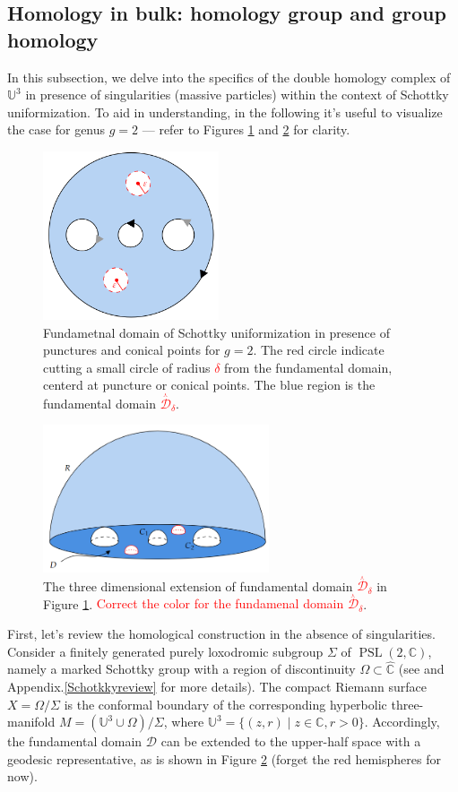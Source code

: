\documentclass[a4paper,11pt]{article}
\newcommand{\PSLC}{\operatorname{PSL}(2,\mathbb{C})}
\newcommand{\SchottkyFund}{\mathcal{D}}
\newcommand{\singfund}{\overset{{}_{\curlywedge}}{\mathcal{D}}}
\begin{document}
\subsection{Homology in bulk: homology group and group homology}\label{homology}
In this subsection, we delve into the specifics of the  double homology complex of $\mathbb{U}^3$ in presence of singularities (massive particles) within the context of Schottky uniformization. To aid in understanding, in the following it's useful to visualize the case for genus  $g=2$ --- refer to Figures \ref{fig:1} and \ref{fig:2} for clarity.
\begin{figure}[h]
\centering
\includegraphics[width=14em]{Pics/1.png}
\caption{Fundametnal domain of Schottky uniformization in presence of punctures and conical points for $g=2$. The red circle indicate cutting a small circle of radius \textcolor{red}{$\delta$} from the fundamental domain, centerd at puncture or conical points. The blue region is the fundamental domain \textcolor{red}{$\singfund_{\delta}$}.}
\label{fig:1}
\end{figure}
\begin{figure}[h]
\centering
\includegraphics[width=18em]{Pics/2.png}
\caption{The three dimensional extension of fundamental domain \textcolor{red}{$\singfund_{\delta}$} in Figure \ref{fig:1}. \textcolor{red}{Correct the color for the fundamenal domain $\singfund_{\delta}$}.}
\label{fig:2}
\end{figure}

First, let's review the  homological construction in the absence of singularities. Consider a finitely generated purely loxodromic subgroup $\Sigma$ of $\PSLC$, namely a marked  Schottky group with a region of discontinuity $\Omega \subset\hat{\mathbb{C}}$ (see \cite{zograf1988uniformization,Taghavi2024classical} and Appendix.\ref{Schotkkyreview} for more details). The compact Riemann surface $X =\Omega\slash \Sigma$ is the conformal boundary of the corresponding hyperbolic three-manifold  $M = (\mathbb{U}^3\cup \Omega)\slash\Sigma$, where $\mathbb{U}^3 = \{(z,r) \; | \; z\in \mathbb{C}, r>0
\}$. Accordingly, the fundamental domain $\SchottkyFund$ can be extended to the upper-half space with a geodesic representative, as is shown in Figure \ref{fig:2} (forget the red hemispheres for now).
\end{document}

